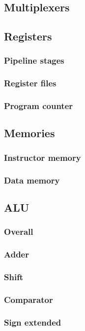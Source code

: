 \documentclass[11pt, a4paper, twoside]{IEEEtran}
\begin{document}
	\subsection{Multiplexers}
	\subsection{Registers}
		\subsubsection{Pipeline stages}
		\subsubsection{Register files}
		\subsubsection{Program counter}
	\subsection{Memories}
		\subsubsection{Instructor memory}
		\subsubsection{Data memory}
	\subsection{ALU}
		\subsubsection{Overall}
		\subsubsection{Adder}
		\subsubsection{Shift}
		\subsubsection{Comparator}
		\subsubsection{Sign extended}
\end{document}
